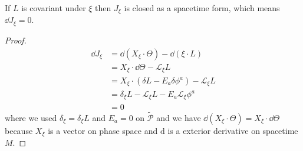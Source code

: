 \documentclass[10pt]{article}
\begin{document}
\begin{claim}
    If $L$ is covariant under $\xi$ then $J_{\xi}$ is closed as a spacetime form, which means $\dd{J_\xi}=0$.
\end{claim}
\begin{proof}
    \begin{equation}
        \begin{split}
            \dd{J_\xi}&=\dd{(X_\xi\cdot\Theta)}-\dd{(\xi\cdot L)}\\
                      &=X_\xi\cdot\dd{\Theta}-\mathcal{L}_\xi L\\
                      &=X_{\xi}\cdot\left(\delta L-E_a\delta\phi^a\right)-\mathcal{L}_\xi L\\
                      &=\delta_\xi L-\mathcal{L}_\xi L-E_a\mathcal{L}_\xi \phi^a\\
                      &=0
        \end{split}
    \end{equation}
    where we used $\delta_\xi=\delta_\xi L$ and $E_a=0$ on $\widetilde{\mathcal{P}}$ and we have $\dd{(X_\xi\cdot\Theta)}=X_\xi\cdot\dd{\Theta}$ because $X_\xi$ is a vector on phase space and $\mathrm{d}$ is a exterior derivative on spacetime $M$.
\end{proof}
\end{document}
